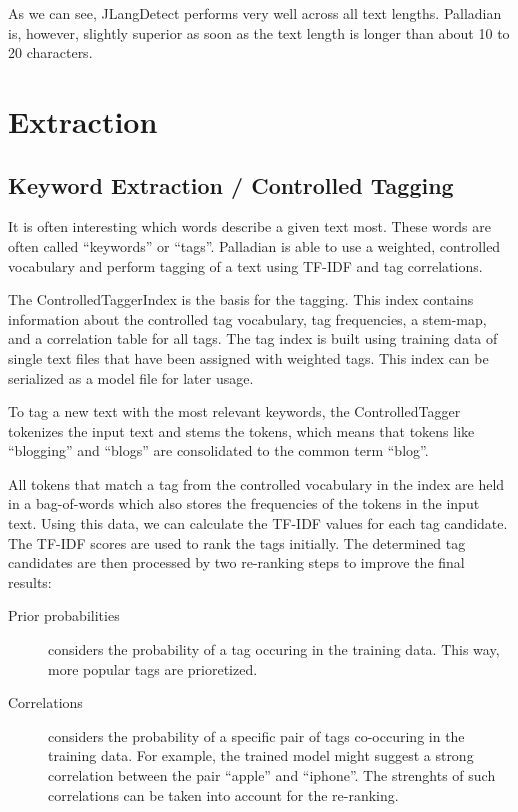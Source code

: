 \documentclass[a4paper,twoside]{book}      %
\begin{document}
As we can see, JLangDetect performs very well across all text lengths. Palladian is, however, slightly superior as soon as the text length is longer than about 10 to 20 characters.

\section{Extraction}

\subsection{Keyword Extraction / Controlled Tagging}
It is often interesting which words describe a given text most. These words are often called ``keywords'' or ``tags''. Palladian is able to use a weighted, controlled vocabulary and perform tagging of a text using TF-IDF and tag correlations.

The ControlledTaggerIndex is the basis for the tagging. This index contains information about the controlled tag vocabulary, tag frequencies, a stem-map, and a correlation table for all tags. The tag index is built using training data of single text files that have been assigned with weighted tags. This index can be serialized as a model file for later usage.

To tag a new text with the most relevant keywords, the ControlledTagger tokenizes the input text and stems the tokens, which means that tokens like ``blogging'' and ``blogs'' are consolidated to the common term ``blog''.

All tokens that match a tag from the controlled vocabulary in the index are held in a bag-of-words which also stores the frequencies of the tokens in the input text. Using this data, we can calculate the TF-IDF values for each tag candidate. The TF-IDF scores are used to rank the tags initially. The determined tag candidates are then processed by two re-ranking steps to improve the final results:

\begin{description}

	\item [Prior probabilities] considers the probability of a tag occuring in the training data. This way, more popular tags are prioretized.

	\item [Correlations] considers the probability of a specific pair of tags co-occuring in the training data. For example, the trained model might suggest a strong correlation between the pair ``apple'' and ``iphone''. The strenghts of such correlations can be taken into account for the re-ranking.

\end{description}
\end{document}
